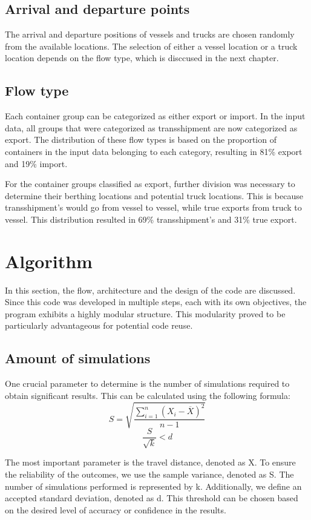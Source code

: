 \documentclass{article}
\begin{document}
\subsection{Arrival and departure points}
The arrival and departure positions of vessels and trucks are chosen randomly
from the available locations. The selection of either a vessel location or a
truck location depends on the flow type, which is disccused in the next
chapter.

\subsection{Flow type}
Each container group can be categorized as either export or import. In the
input data, all groups that were categorized as transshipment are now
categorized as export. The distribution of these flow types is based on the
proportion of containers in the input data belonging to each category,
resulting in 81\% export and 19\% import.

For the container groups classified as export, further division was necessary
to determine their berthing locations and potential truck locations. This is
because transshipment's would go from vessel to vessel, while true exports from
truck to vessel. This distribution resulted in 69\% transshipment's and 31\%
true export.

\section{Algorithm}
In this section, the flow, architecture and the design of the code are
discussed. Since this code was developed in multiple steps, each with its own
objectives, the program exhibits a highly modular structure. This modularity
proved to be particularly advantageous for potential code reuse.

\subsection{Amount of simulations}
One crucial parameter to determine is the number of simulations required to
obtain significant results. This can be calculated using the following formula: \[S = \sqrt{\frac{\sum_{i = 1}^{n}(X_i-\overline{X})^2}{n
            -1}}\] \[\frac{S}{\sqrt{k}} < d\]

The most important parameter is the travel distance, denoted as X. To ensure
the reliability of the outcomes, we use the sample variance, denoted as S. The
number of simulations performed is represented by k. Additionally, we define an
accepted standard deviation, denoted as d. This threshold can be chosen based
on the desired level of accuracy or confidence in the results.
\end{document}
